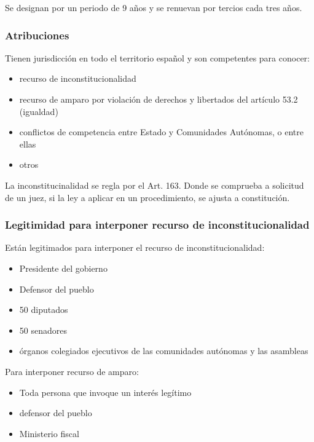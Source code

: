         Se designan por un periodo de 9 años y se renuevan por tercios cada tres años.

    \subsubsection{Atribuciones} %
        Tienen jurisdicción en todo el territorio español y son competentes para conocer:
        \begin{itemize}
            \item recurso de inconstitucionalidad
            \item recurso de amparo por violación de derechos y libertados del artículo 53.2 (igualdad)
            \item conflictos de competencia entre Estado y Comunidades Autónomas, o entre ellas
            \item otros
        \end{itemize}

        La inconstitucinalidad se regla por el Art. 163. Donde se comprueba a solicitud de un juez, si la ley a aplicar en un procedimiento, se ajusta a constitución.

    \subsubsection{Legitimidad para interponer recurso de inconstitucionalidad} %
        Están legitimados para interponer el recurso de inconstitucionalidad:
        \begin{itemize}
            \item Presidente del gobierno
            \item Defensor del pueblo
            \item 50 diputados
            \item 50 senadores
            \item órganos colegiados ejecutivos de las comunidades autónomas y las asambleas
        \end{itemize}

        Para interponer recurso de amparo:
        \begin{itemize}
            \item Toda persona que invoque un interés legítimo
            \item defensor del pueblo
            \item Ministerio fiscal
        \end{itemize}

